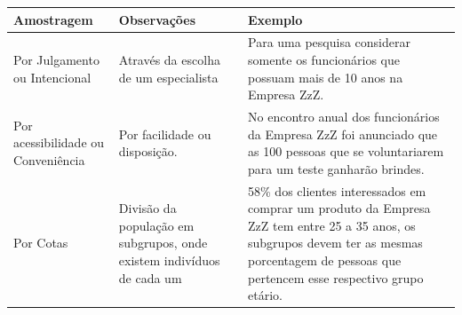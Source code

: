 \documentclass[a4paper,11pt]{article}
\begin{document}
\begin{table}[H]
	\centering 
	\begin{tabular}{m{3cm}|m{4cm}|m{5.5cm}}
		\textbf{Amostragem} & \textbf{Observações} & \textbf{Exemplo} \\
		\hline
		Por Julgamento ou Intencional & Através da escolha de um especialista & Para uma pesquisa considerar somente os funcionários que possuam mais de 10 anos na Empresa ZzZ. \\
		Por acessibilidade ou Conveniência & Por facilidade ou disposição. & No encontro anual dos funcionários da Empresa ZzZ foi anunciado que as 100 pessoas que se voluntariarem para um teste ganharão brindes. \\
		Por Cotas & Divisão da população em subgrupos, onde existem indivíduos de cada um & 58\% dos clientes interessados em comprar um produto da Empresa ZzZ tem entre 25 a 35 anos, os subgrupos devem ter as mesmas porcentagem de pessoas que pertencem esse respectivo grupo etário.
	\end{tabular}
\end{table}
\end{document}
